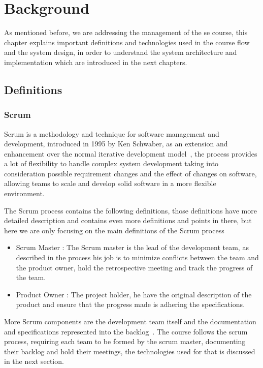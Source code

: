 \chapter{Background}
\label{chap:background}

As mentioned before, we are addressing the management of the \ac{se} course, this chapter explains
important definitions and technologies used in the course flow and the system design, in order to understand
the system architecture and implementation which are introduced in the next chapters.

\section{Definitions}
\label{sec:definitions}

\subsection{Scrum}
\label{sub:scrum-process}

Scrum is a methodology and technique for software management and development, introduced in 1995 by Ken Schwaber,
as an extension and enhancement over the normal iterative development model~\cite{Schwaber1997}, the process
provides a lot of flexibility to handle complex system development taking into consideration possible requirement
changes and the effect of changes on software, allowing teams to scale and develop solid software in a more flexible
environment.~\cite{Schwaber1997}

\newParagraph
The Scrum process contains the following definitions, those definitions have more detailed description and contains even
more definitions and points in there, but here we are only focusing on the main definitions of the Scrum process
\begin{itemize}
  \item Scrum Master : The Scrum master is the lead of the development team, as described in the process his job
  is to minimize conflicts between the team and the product owner, hold the retrospective meeting and track
  the progress of the team.~\cite{schwaber_2004}
  \item Product Owner : The project holder, he have the original description of the product and ensure that the
  progress made is adhering the specifications.~\cite{schwaber_2004}
\end{itemize}

\newParagraph
More Scrum components are the development team itself and the documentation and specifications represented into the backlog~\cite{schwaber_2004}.
The course follows the scrum process, requiring each team to be formed by the scrum master, documenting their backlog and hold their meetings, the
technologies used for that is discussed in the next section.

